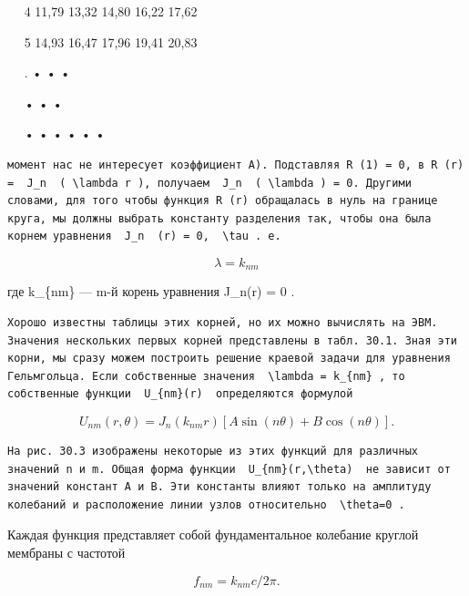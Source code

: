 \documentclass[
  ukrainian,
]{article}
\begin{document}
~~\textbar{} 4 \textbar{} 11,79 \textbar{} 13,32 \textbar{} 14,80
\textbar{} 16,22 \textbar{} 17,62 \textbar{} \textbar{} \textbar{}

~~\textbar{} 5 \textbar{} 14,93 \textbar{} 16,47 \textbar{} 17,96
\textbar{} 19,41 \textbar{} 20,83 \textbar{} \textbar{} \textbar{}

~~\textbar{} . \textbar{} • \textbar{} \textbar{} • \textbar{}
\textbar{} • \textbar{} \textbar{} \textbar{}

~~\textbar{} \textbar{} \textbar{} • \textbar{} \textbar{} • \textbar{}
• \textbar{} \textbar{} \textbar{}

~~\textbar{} • \textbar{} • \textbar{} • \textbar{} • \textbar{} •
\textbar{} • \textbar{} \textbar{} \textbar{}

\begin{verbatim}
момент нас не интересует коэффициент A). Подставляя R (1) = 0, в R (r) =  J_n  ( \lambda r ), получаем  J_n  ( \lambda ) = 0. Другими словами, для того чтобы функция R (r) обращалась в нуль на границе круга, мы должны выбрать константу разделения так, чтобы она была корнем уравнения  J_n  (r) = 0,  \tau . e.
\end{verbatim}

\[
\lambda = k_{nm}
\]

где k\_\{nm\} --- m-й корень уравнения J\_n(r) = 0 .

\begin{verbatim}
Хорошо известны таблицы этих корней, но их можно вычислять на ЭВМ. Значения нескольких первых корней представлены в табл. 30.1. Зная эти корни, мы сразу можем построить решение краевой задачи для уравнения Гельмгольца. Если собственные значения  \lambda = k_{nm} , то собственные функции  U_{nm}(r)  определяются формулой
\end{verbatim}

\[
U_{nm}(r, \theta) = J_n(k_{nm}r) [A \sin(n\theta) + B \cos(n\theta)].
\]

\begin{verbatim}
На рис. 30.3 изображены некоторые из этих функций для различных значений n и m. Общая форма функции  U_{nm}(r,\theta)  не зависит от значений констант A и B. Эти константы влияют только на амплитуду колебаний и расположение линии узлов относительно  \theta=0 .
\end{verbatim}

Каждая функция представляет собой фундаментальное колебание круглой
мембраны с частотой

\[
f_{nm} = k_{nm}c/2\pi.
\]
\end{document}
